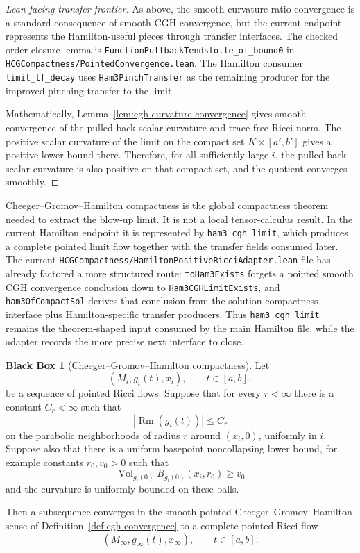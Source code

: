 \documentclass[11pt]{article}
\theoremstyle{plain}
\theoremstyle{definition}
\newtheorem{blackbox}[theorem]{Black Box}
\theoremstyle{remark}
\newcommand{\Rm}{\operatorname{Rm}}
\newcommand{\Vol}{\operatorname{Vol}}
\newcommand{\norm}[1]{\left|#1\right|}
\newcommand{\leanref}[1]{\nolinkurl{#1}}
\newcommand{\leanfile}[1]{\nolinkurl{#1}}
\newcommand{\rffile}[1]{\leanfile{#1}}
\begin{document}
\begin{proof}[Lean-facing transfer frontier]
As above, the smooth curvature-ratio convergence is a standard consequence of
smooth CGH convergence, but the current endpoint represents the Hamilton-useful
pieces through transfer interfaces.  The checked order-closure lemma is
\leanref{FunctionPullbackTendsto.le_of_bound0} in
\rffile{HCGCompactness/PointedConvergence.lean}.  The Hamilton consumer
\leanref{limit_tf_decay} uses \leanref{Ham3PinchTransfer} as the remaining
producer for the improved-pinching transfer to the limit.

Mathematically, Lemma~\ref{lem:cgh-curvature-convergence} gives smooth
convergence of the pulled-back scalar curvature and trace-free Ricci norm.  The
positive scalar curvature of the limit on the compact set $K\times[a',b']$
gives a positive lower bound there.  Therefore, for all sufficiently large
$i$, the pulled-back scalar curvature is also positive on that compact set, and
the quotient converges smoothly.
\end{proof}

Cheeger--Gromov--Hamilton compactness is the global compactness theorem needed
to extract the blow-up limit.  It is not a local tensor-calculus result.  In the
current Hamilton endpoint it is represented by \leanref{ham3_cgh_limit}, which
produces a complete pointed limit flow together with the transfer fields
consumed later.  The current
\rffile{HCGCompactness/HamiltonPositiveRicciAdapter.lean} file has already
factored a more structured route: \leanref{toHam3Exists} forgets a pointed
smooth CGH convergence conclusion down to \leanref{Ham3CGHLimitExists}, and
\leanref{ham3OfCompactSol} derives that conclusion from the solution
compactness interface plus Hamilton-specific transfer producers.  Thus
\leanref{ham3_cgh_limit} remains the theorem-shaped input consumed by the main
Hamilton file, while the adapter records the more precise next interface to
close.

\begin{blackbox}[Cheeger--Gromov--Hamilton compactness]
\label{bb:cgh-compactness}
Let
\[
(M_i,g_i(t),x_i),
\qquad
 t\in[a,b],
\]
be a sequence of pointed Ricci flows. Suppose that for every $r<\infty$ there
is a constant $C_r<\infty$ such that
\[
\norm{\Rm(g_i(t))}\le C_r
\]
on the parabolic neighborhoods of radius $r$ around $(x_i,0)$, uniformly in
$i$. Suppose also that there is a uniform basepoint noncollapsing lower bound,
for example constants $r_0,v_0>0$ such that
\[
\Vol_{g_i(0)}B_{g_i(0)}(x_i,r_0)\ge v_0
\]
and the curvature is uniformly bounded on these balls.

Then a subsequence converges in the smooth pointed Cheeger--Gromov--Hamilton
sense of Definition~\ref{def:cgh-convergence} to a complete pointed Ricci flow
\[
(M_\infty,g_\infty(t),x_\infty),
\qquad
 t\in[a,b].
\]
\end{blackbox}
\end{document}
